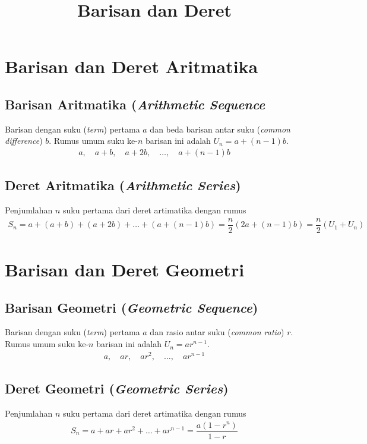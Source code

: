 \documentclass[12pt]{scrartcl}
\title{Barisan dan Deret}
\begin{document}
\renewcommand*\contentsname{Daftar Isi}
\tableofcontents

\newpage
{}

\section{Barisan dan Deret Aritmatika}
\subsection{Barisan Aritmatika (\textit{Arithmetic Sequence}}
Barisan dengan suku (\textit{term}) pertama $a$ dan beda barisan antar suku (\textit{common difference}) $b$. Rumus umum suku ke-$n$ barisan ini adalah $U_n = a + (n-1)b$.
\begin{align*}
    a, \quad a+b, \quad a+2b, \quad \ldots, \quad a+(n-1)b
\end{align*}

\subsection{Deret Aritmatika (\textit{Arithmetic Series})}
Penjumlahan $n$ suku pertama dari deret artimatika dengan rumus 
\begin{align*}
    S_n = a + (a+b) + (a+2b) + \ldots + (a+(n-1)b) = \dfrac{n}{2}\left(2a+(n-1)b\right) =\dfrac{n}{2}\left(U_1+U_n\right)
\end{align*}

\section{Barisan dan Deret Geometri}
\subsection{Barisan Geometri (\textit{Geometric Sequence})}
Barisan dengan suku (\textit{term}) pertama $a$ dan rasio antar suku (\textit{common ratio}) $r$. Rumus umum suku ke-$n$ barisan ini adalah $U_n = ar^{n-1}$.
\begin{align*}
    a, \quad ar, \quad ar^2, \quad \ldots, \quad ar^{n-1}
\end{align*}

\subsection{Deret Geometri (\textit{Geometric Series})}
Penjumlahan $n$ suku pertama dari deret artimatika dengan rumus
\begin{align*}
    S_n = a + ar+ar^2+\ldots+ar^{n-1} = \dfrac{a(1-r^n)}{1-r}
\end{align*}
\end{document}
